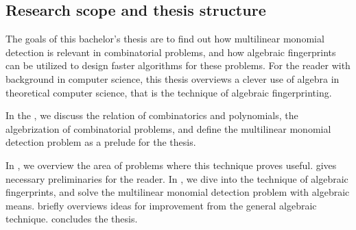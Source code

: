 \subsection{Research scope and thesis structure}

The goals of this bachelor's thesis are 
to find out how multilinear monomial detection is relevant in combinatorial problems, 
and how algebraic fingerprints can be utilized to design faster 
algorithms for these problems. For the reader with background in computer science, 
this thesis overviews a clever use of algebra in theoretical computer science, 
that is the technique of algebraic fingerprinting.

In the , we discuss the relation of combinatorics and 
polynomials,  the algebrization of combinatorial problems, and 
define the multilinear monomial detection problem as a prelude for the thesis. 

In , we overview the area of problems where 
this technique proves useful.  gives necessary 
preliminaries for the reader. In , we 
dive into the technique of algebraic fingerprints, and solve the 
multilinear monomial detection problem with algebraic means. 
 briefly overviews ideas for 
improvement from the general algebraic technique. 
 concludes the thesis.




